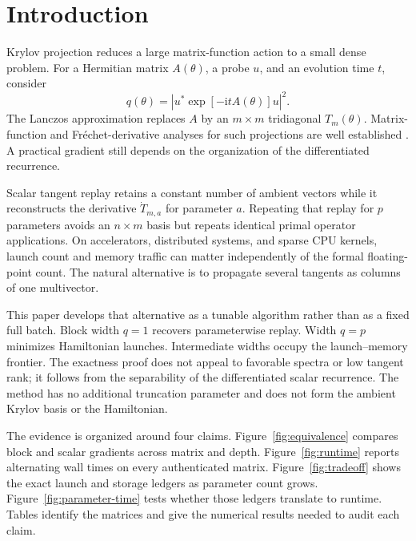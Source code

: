 \documentclass[10pt,letterpaper,twoside]{article}
\begin{document}
\section{Introduction}

Krylov projection reduces a large matrix-function action to a small dense
problem.  For a Hermitian matrix $A(\theta)$, a probe $u$, and an evolution
time $t$, consider
\begin{equation}
 q(\theta)=\left|u^*\exp[-\mathrm{i}tA(\theta)]u\right|^2.
 \label{eq:objective}
\end{equation}
The Lanczos approximation replaces $A$ by an $m\times m$ tridiagonal
$T_m(\theta)$.  Matrix-function and Fr\'echet-derivative analyses for such
projections are well established
\cite{higham2008functions,saad1992analysis,almohy2009frechet,casulli2025lowmemory}.  A practical
gradient still depends on the organization of the differentiated recurrence.

Scalar tangent replay retains a constant number of ambient vectors while it
reconstructs the derivative $\dot T_{m,a}$ for parameter $a$.  Repeating that
replay for $p$ parameters avoids an $n\times m$ basis but repeats identical
primal operator applications.  On accelerators, distributed systems, and
sparse CPU kernels, launch count and memory traffic can matter independently
of the formal floating-point count.  The natural alternative is to propagate
several tangents as columns of one multivector.

This paper develops that alternative as a tunable algorithm rather than as a
fixed full batch.  Block width $q=1$ recovers parameterwise replay.  Width
$q=p$ minimizes Hamiltonian launches.  Intermediate widths occupy the
launch--memory frontier.  The exactness proof does not appeal to favorable
spectra or low tangent rank; it follows from the separability of the
differentiated scalar recurrence.  The method has no additional truncation
parameter and does not form the ambient Krylov basis or the Hamiltonian.

The evidence is organized around four claims.  Figure~\ref{fig:equivalence}
compares block and scalar gradients across matrix and depth.  Figure~\ref{fig:runtime}
reports alternating wall times on every authenticated matrix.  Figure~\ref{fig:tradeoff}
shows the exact launch and storage ledgers as parameter count grows.
Figure~\ref{fig:parameter-time} tests whether those ledgers translate to
runtime.  Tables identify the matrices and give the numerical results needed
to audit each claim.
\end{document}
